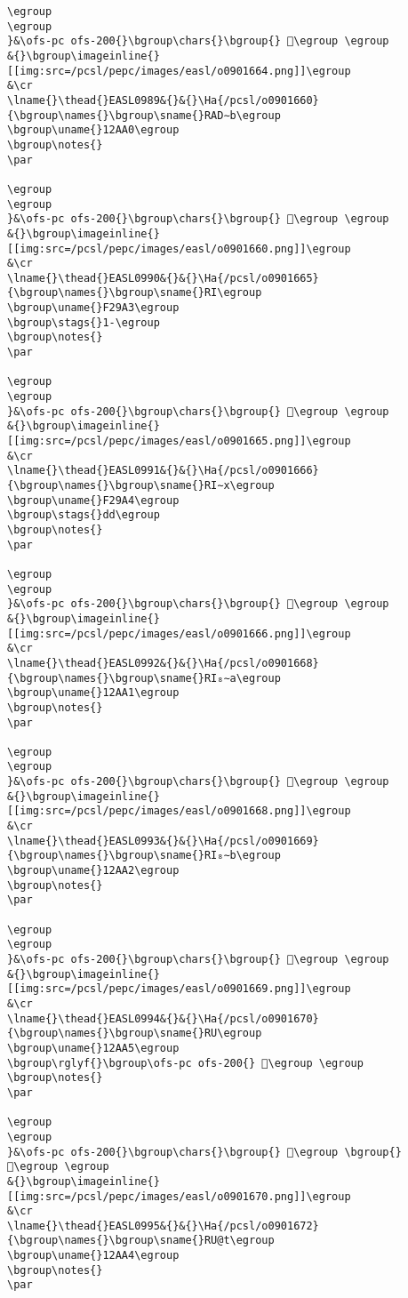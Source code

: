 \begin{verbatim}
\egroup
\egroup
}&\ofs-pc ofs-200{}\bgroup\chars{}\bgroup{} 𒪟\egroup \egroup
&{}\bgroup\imageinline{}[[img:src=/pcsl/pepc/images/easl/o0901664.png]]\egroup
&\cr
\lname{}\thead{}EASL0989&{}&{}\Ha{/pcsl/o0901660}{\bgroup\names{}\bgroup\sname{}RAD∼b\egroup
\bgroup\uname{}12AA0\egroup
\bgroup\notes{}
\par 

\egroup
\egroup
}&\ofs-pc ofs-200{}\bgroup\chars{}\bgroup{} 𒪠\egroup \egroup
&{}\bgroup\imageinline{}[[img:src=/pcsl/pepc/images/easl/o0901660.png]]\egroup
&\cr
\lname{}\thead{}EASL0990&{}&{}\Ha{/pcsl/o0901665}{\bgroup\names{}\bgroup\sname{}RI\egroup
\bgroup\uname{}F29A3\egroup
\bgroup\stags{}1-\egroup
\bgroup\notes{}
\par 

\egroup
\egroup
}&\ofs-pc ofs-200{}\bgroup\chars{}\bgroup{} 󲦣\egroup \egroup
&{}\bgroup\imageinline{}[[img:src=/pcsl/pepc/images/easl/o0901665.png]]\egroup
&\cr
\lname{}\thead{}EASL0991&{}&{}\Ha{/pcsl/o0901666}{\bgroup\names{}\bgroup\sname{}RI∼x\egroup
\bgroup\uname{}F29A4\egroup
\bgroup\stags{}dd\egroup
\bgroup\notes{}
\par 

\egroup
\egroup
}&\ofs-pc ofs-200{}\bgroup\chars{}\bgroup{} 󲦤\egroup \egroup
&{}\bgroup\imageinline{}[[img:src=/pcsl/pepc/images/easl/o0901666.png]]\egroup
&\cr
\lname{}\thead{}EASL0992&{}&{}\Ha{/pcsl/o0901668}{\bgroup\names{}\bgroup\sname{}RI₈∼a\egroup
\bgroup\uname{}12AA1\egroup
\bgroup\notes{}
\par 

\egroup
\egroup
}&\ofs-pc ofs-200{}\bgroup\chars{}\bgroup{} 𒪡\egroup \egroup
&{}\bgroup\imageinline{}[[img:src=/pcsl/pepc/images/easl/o0901668.png]]\egroup
&\cr
\lname{}\thead{}EASL0993&{}&{}\Ha{/pcsl/o0901669}{\bgroup\names{}\bgroup\sname{}RI₈∼b\egroup
\bgroup\uname{}12AA2\egroup
\bgroup\notes{}
\par 

\egroup
\egroup
}&\ofs-pc ofs-200{}\bgroup\chars{}\bgroup{} 𒪢\egroup \egroup
&{}\bgroup\imageinline{}[[img:src=/pcsl/pepc/images/easl/o0901669.png]]\egroup
&\cr
\lname{}\thead{}EASL0994&{}&{}\Ha{/pcsl/o0901670}{\bgroup\names{}\bgroup\sname{}RU\egroup
\bgroup\uname{}12AA5\egroup
\bgroup\rglyf{}\bgroup\ofs-pc ofs-200{} 𒪥\egroup \egroup
\bgroup\notes{}
\par 

\egroup
\egroup
}&\ofs-pc ofs-200{}\bgroup\chars{}\bgroup{} 𒪣\egroup \bgroup{} 𒪥\egroup \egroup
&{}\bgroup\imageinline{}[[img:src=/pcsl/pepc/images/easl/o0901670.png]]\egroup
&\cr
\lname{}\thead{}EASL0995&{}&{}\Ha{/pcsl/o0901672}{\bgroup\names{}\bgroup\sname{}RU@t\egroup
\bgroup\uname{}12AA4\egroup
\bgroup\notes{}
\par 


\end{verbatim}
